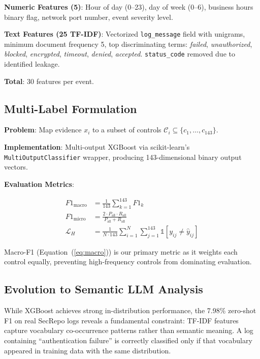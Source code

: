 \documentclass[futureinternet,article,submit,pdftex,moreauthors]{Definitions/mdpi}
\begin{document}
\textbf{Numeric Features (5)}: Hour of day (0--23), day of week (0--6), business hours
binary flag, network port number, event severity level.

\textbf{Text Features (25 TF-IDF)}: Vectorized \texttt{log\_message} field with unigrams,
minimum document frequency 5, top discriminating terms: \textit{failed},
\textit{unauthorized}, \textit{blocked}, \textit{encrypted}, \textit{timeout},
\textit{denied}, \textit{accepted}. \texttt{status\_code} removed due to identified leakage.

\textbf{Total}: 30 features per event.

\subsection{Multi-Label Formulation}

\textbf{Problem}: Map evidence $x_i$ to a subset of controls
$\mathcal{C}_i \subseteq \{c_1, \ldots, c_{143}\}$.

\textbf{Implementation}: Multi-output XGBoost via scikit-learn's
\texttt{MultiOutputClassifier} wrapper, producing 143-dimensional binary output vectors.

\textbf{Evaluation Metrics}:
\begin{linenomath}
\begin{align}
F1_{\text{macro}} &= \frac{1}{143}\sum_{k=1}^{143} F1_k \label{eq:macro}\\
F1_{\text{micro}} &= \frac{2 \cdot P_{\text{all}} \cdot R_{\text{all}}}{P_{\text{all}} + R_{\text{all}}} \label{eq:micro}\\
\mathcal{L}_{H} &= \frac{1}{N \cdot 143}\sum_{i=1}^{N}\sum_{j=1}^{143} \mathbb{1}[y_{ij} \neq \hat{y}_{ij}] \label{eq:hamming}
\end{align}
\end{linenomath}

Macro-F1 (Equation~(\ref{eq:macro})) is our primary metric as it weights each control
equally, preventing high-frequency controls from dominating evaluation.

\subsection{Evolution to Semantic LLM Analysis}

While XGBoost achieves strong in-distribution performance, the 7.98\% zero-shot F1 on real
SecRepo logs reveals a fundamental constraint: TF-IDF features capture vocabulary co-occurrence
patterns rather than semantic meaning. A log containing ``authentication failure'' is correctly
classified only if that vocabulary appeared in training data with the same distribution.
\end{document}
